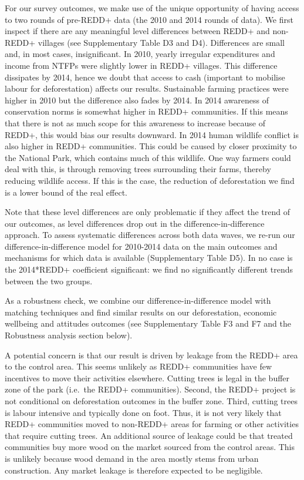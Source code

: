 \documentclass[
]{article}
\begin{document}
For our survey outcomes, we make use of the unique opportunity of having
access to two rounds of pre-REDD+ data (the 2010 and 2014 rounds of
data). We first inspect if there are any meaningful level differences
between REDD+ and non-REDD+ villages (see Supplementary Table D3 and
D4). Differences are small and, in most cases, insignificant. In 2010,
yearly irregular expenditures and income from NTFPs were slightly lower
in REDD+ villages. This difference dissipates by 2014, hence we doubt
that access to cash (important to mobilise labour for deforestation)
affects our results. Sustainable farming practices were higher in 2010
but the difference also fades by 2014. In 2014 awareness of conservation
norms is somewhat higher in REDD+ communities. If this means that there
is not as much scope for this awareness to increase because of REDD+,
this would bias our results downward. In 2014 human wildlife conflict is
also higher in REDD+ communities. This could be caused by closer
proximity to the National Park, which contains much of this wildlife.
One way farmers could deal with this, is through removing trees
surrounding their farms, thereby reducing wildlife access. If this is
the case, the reduction of deforestation we find is a lower bound of the
real effect.

Note that these level differences are only problematic if they affect
the trend of our outcomes, as level differences drop out in the
difference-in-difference approach. To assess systematic differences
across both data waves, we re-run our difference-in-difference model for
2010-2014 data on the main outcomes and mechanisms for which data is
available (Supplementary Table D5). In no case is the 2014*REDD+
coefficient significant: we find no significantly different trends
between the two groups.

As a robustness check, we combine our difference-in-difference model
with matching techniques and find similar results on our deforestation,
economic wellbeing and attitudes outcomes (see Supplementary Table F3
and F7 and the Robustness analysis section below).

A potential concern is that our result is driven by leakage from the
REDD+ area to the control area. This seems unlikely as REDD+ communities
have few incentives to move their activities elsewhere. Cutting trees is
legal in the buffer zone of the park (i.e.~the REDD+ communities).
Second, the REDD+ project is not conditional on deforestation outcomes
in the buffer zone. Third, cutting trees is labour intensive and
typically done on foot. Thus, it is not very likely that REDD+
communities moved to non-REDD+ areas for farming or other activities
that require cutting trees. An additional source of leakage could be
that treated communities buy more wood on the market sourced from the
control areas. This is unlikely because wood demand in the area mostly
stems from urban construction. Any market leakage is therefore expected
to be negligible.
\end{document}
